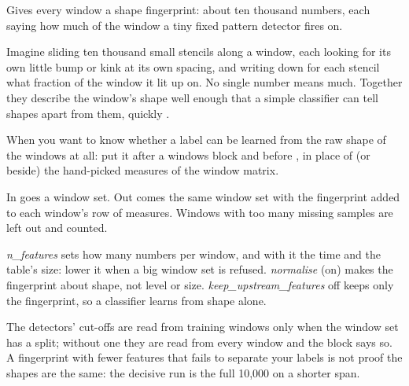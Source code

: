Gives every window a shape fingerprint: about ten thousand numbers, each saying how much of
the window a tiny fixed pattern detector fires on.

\begin{plainterms}
Imagine sliding ten thousand small stencils along a window, each looking for its own little
bump or kink at its own spacing, and writing down for each stencil what fraction of the
window it lit up on. No single number means much. Together they describe the window's shape
well enough that a simple classifier can tell shapes apart from them, quickly
\citep{dempster2021minirocket}.
\end{plainterms}

When you want to know whether a label can be learned from the raw shape of the windows at
all: put it after a windows block and before , in place of
(or beside) the hand-picked measures of the window matrix.

In goes a window set. Out comes the same window set with the fingerprint added to each
window's row of measures. Windows with too many missing samples are left out and counted.

\emph{n\_features} sets how many numbers per window, and with it the time and the table's
size: lower it when a big window set is refused. \emph{normalise} (on) makes the fingerprint
about shape, not level or size. \emph{keep\_upstream\_features} off keeps only the
fingerprint, so a classifier learns from shape alone.

The detectors' cut-offs are read from training windows only when the window set has a split;
without one they are read from every window and the block says so. A fingerprint with fewer
features that fails to separate your labels is not proof the shapes are the same: the
decisive run is the full 10{,}000 on a shorter span.
